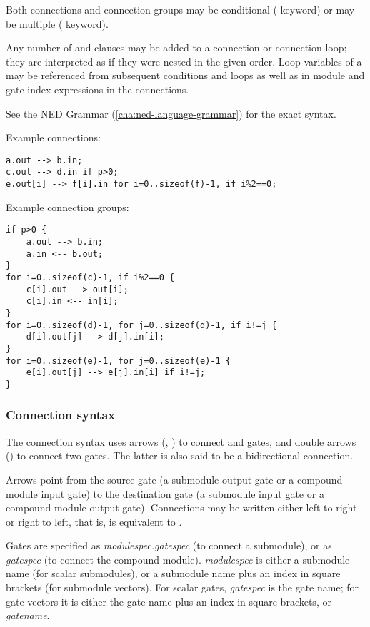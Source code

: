 Both connections and connection groups may be conditional (
keyword) or may be multiple ( keyword).

Any number of  and  clauses may be added to
a connection or connection loop; they are interpreted as if they were
nested in the given order. Loop variables of a  may be
referenced from subsequent conditions and loops as well as in module and
gate index expressions in the connections.

See the NED Grammar (\ref{cha:ned-language-grammar}) for the exact syntax.

Example connections:

\begin{verbatim}
a.out --> b.in;
c.out --> d.in if p>0;
e.out[i] --> f[i].in for i=0..sizeof(f)-1, if i%2==0;
\end{verbatim}

Example connection groups:

\begin{verbatim}
if p>0 {
    a.out --> b.in;
    a.in <-- b.out;
}
for i=0..sizeof(c)-1, if i%2==0 {
    c[i].out --> out[i];
    c[i].in <-- in[i];
}
for i=0..sizeof(d)-1, for j=0..sizeof(d)-1, if i!=j {
    d[i].out[j] --> d[j].in[i];
}
for i=0..sizeof(e)-1, for j=0..sizeof(e)-1 {
    e[i].out[j] --> e[j].in[i] if i!=j;
}
\end{verbatim}


\subsubsection{Connection syntax}

The connection syntax uses arrows (\ttt{-{}->}, \ttt{<-{}-}) to connect
 and  gates, and double arrows
(\ttt{<-{}->}) to connect two  gates. The latter is
also said to be a bidirectional connection.

Arrows point from the source gate (a submodule output gate or a compound
module input gate) to the destination gate (a submodule input gate or a
compound module output gate). Connections may be written either left to right
or right to left, that is,  is equivalent to .

Gates are specified as \textit{modulespec.gatespec} (to connect a submodule),
or as \textit{gatespec} (to connect the compound module). \textit{modulespec}
is either a submodule name (for scalar submodules), or a submodule name plus
an index in square brackets (for submodule vectors). For scalar gates,
\textit{gatespec} is the gate name; for gate vectors it is either the gate name
plus an index in square brackets, or \textit{gatename}\ttt{++}.


